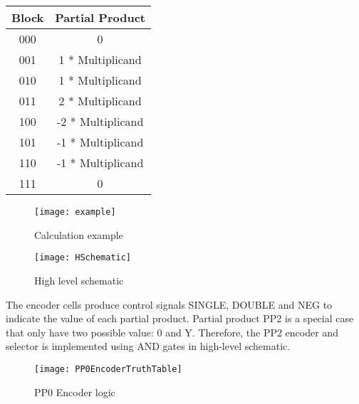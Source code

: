 \documentclass[conference]{IEEEtran}
\begin{document}
\begin{table}[!htb]
\renewcommand{\arraystretch}{1.3}
\centering
\begin{tabular}{|c||c|}
\hline
Block & Partial Product\\
\hline
000 & 0\\
\hline
001 & 1 * Multiplicand\\
\hline
010 & 1 * Multiplicand\\
\hline
011 & 2 * Multiplicand\\
\hline
100 & -2 * Multiplicand\\
\hline
101 & -1 * Multiplicand\\
\hline
110 & -1 * Multiplicand\\
\hline
111 & 0\\
\hline
\end{tabular}
\end{table}

\begin{figure}[!htb]
\centering
\texttt{[image: example]}
\caption{Calculation example}
\label{fig_sim}
\end{figure}

\begin{figure}[!htb]
\centering
\texttt{[image: HSchematic]}
\caption{High level schematic}
\label{fig_sim}
\end{figure}


The encoder cells produce control signals SINGLE, DOUBLE and NEG to indicate the value of each partial product. Partial product PP2 is a special case that only have two possible value: 0 and Y. Therefore, the PP2 encoder and selector is implemented using AND gates in high-level schematic.

\begin{figure}[!htb]
\centering
\texttt{[image: PP0EncoderTruthTable]}
\caption{PP0 Encoder logic}
\label{fig_sim}
\end{figure}
\end{document}
